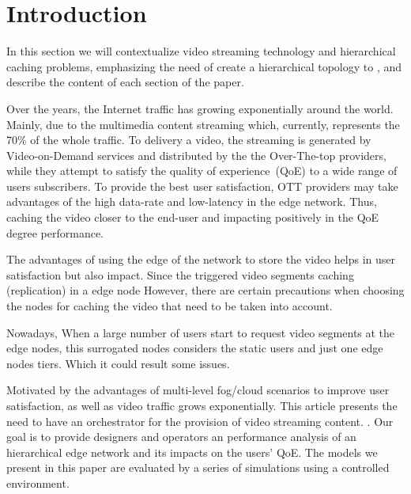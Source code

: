 \section{Introduction}
\label{sec:introduction}

{\color{blue} In this section we will contextualize video streaming technology and hierarchical caching problems, emphasizing the need of create a hierarchical topology to , and describe the content of each section of the paper.}

Over the years, the Internet traffic has growing exponentially around the world. Mainly, due to the multimedia content streaming which, currently, represents the 70\% of the whole traffic. To delivery a video, the streaming is generated by Video-on-Demand services and distributed by the the Over-The-top providers, while they attempt to satisfy the quality of experience~(QoE) to a wide range of users subscribers. To provide the best user satisfaction, OTT providers may take advantages of the high data-rate and low-latency in the edge network. Thus, caching the video closer to the end-user and impacting positively in the QoE degree performance.

The advantages of using the edge of the network to store the video helps in user satisfaction but also impact. Since the triggered video segments caching (replication) in a edge node
However, there are certain precautions when choosing the nodes for caching the video that need to be taken into account. 

Nowadays, When a large number of users start to request video segments at the edge nodes, this surrogated nodes considers the static users and just one edge nodes tiers. Which it could result some issues. 

Motivated by the advantages of multi-level fog/cloud scenarios to improve user satisfaction, as well as video traffic grows exponentially. This article presents the need to have an orchestrator for the provision of video streaming content.
. Our goal is to provide designers and operators an performance analysis  of an hierarchical edge network and its impacts on the users' QoE. The models we present in this paper are evaluated by a series of simulations using a controlled environment.

